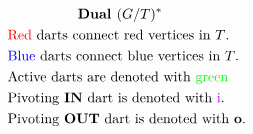 \documentclass{article}
\begin{document}
\hfill%
\hspace{-4cm}
\begin{minipage}[t]{0.48\linewidth}
\begin{align*}
& \qquad \qquad \quad \textbf{Dual $(G/T)^*$} \\
& \text{{\color{red} Red} darts connect red vertices in $T$.} \\
& \text{{\color{blue} Blue} darts connect blue vertices in $T$.} \\
& \text{Active darts are denoted with {\color{green} green}} \\
& \text{Pivoting \textbf{IN} dart is denoted with {\color{electricpurple} i}.} \\
& \text{Pivoting \textbf{OUT} dart is denoted with \textbf{o}.}
\end{align*}
\end{minipage}
\end{document}
